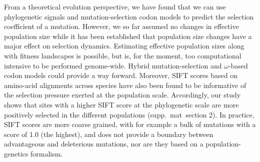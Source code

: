\documentclass{article}
\begin{document}
    From a theoretical evolution perspective, we have found that we can use phylogenetic signals and mutation-selection codon models to predict the selection coefficient of a mutation.
    However, we so far assumed no changes in effective population size while it has been established that population size changes have a major effect on selection dynamics\cite{lanfear_population_2014, jones_shifting_2017, platt_protein_2018}.
    Estimating effective population sizes along with fitness landscapes is possible\cite{latrille_inferring_2021}, but is, for the moment, too computational intensive to be performed genome-wide\cite{latrille_inferring_2021}.
    Hybrid mutation-selection and $\omega$-based codon models could provide a way forward\cite{brevet_reconstructing_2021}.
    Moreover, SIFT scores based on amino-acid alignments across species have also been found to be informative of the selection pressure exerted at the population scale\cite{chen_hunting_2021}.
    Accordingly, our study shows that sites with a higher SIFT score at the phylogenetic scale are more positively selected in the different populations (supp.\ mat\  section 2).
    In practice, SIFT scores are more coarse grained, with for example a bulk of mutations with a score of 1.0 (the highest), and does not provide a boundary between advantageous and deleterious mutations, nor are they based on a population-genetics formalism.

\end{document}
